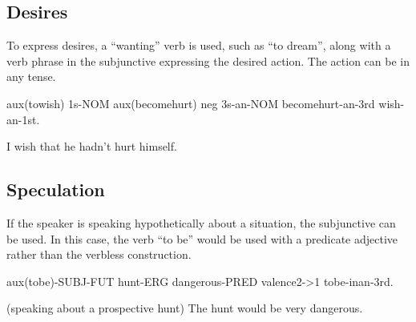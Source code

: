 \subsection{Desires}

To express desires, a ``wanting'' verb is used, such as ``to dream'', along with
a verb phrase in the subjunctive expressing the desired action. The action can
be in any tense.

aux(towish) 1s-NOM aux(becomehurt) neg 3s-an-NOM becomehurt-an-3rd wish-an-1st.

I wish that he hadn't hurt himself.

\subsection{Speculation}

If the speaker is speaking hypothetically about a situation, the subjunctive can
be used. In this case, the verb ``to be'' would be used with a predicate
adjective rather than the verbless construction.

aux(tobe)-SUBJ-FUT hunt-ERG dangerous-PRED valence2->1 tobe-inan-3rd.

(speaking about a prospective hunt) The hunt would be very dangerous.
